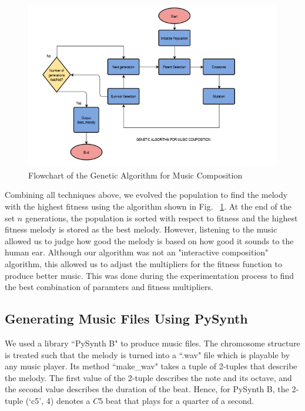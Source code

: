 \documentclass[conference]{IEEEtran}
\begin{document}
\begin{figure}
\includegraphics[width=10 cm, height= 10 cm ]{Flowchart.png}
\caption{ Flowchart of the Genetic Algorithm for Music Composition}
\label{flow}
\end{figure}

Combining all techniques above, we evolved the population to find the melody with the highest fitness using the algorithm shown in Fig. ~\ref{flow}. At the end of the set $n$ generations, the population is sorted with respect to fitness and the highest fitness melody is stored as the best melody. However, listening to the music allowed us to judge how good the melody is based on how good it sounds to the human ear. Although our algorithm was not an "interactive composition" algorithm, this allowed us to adjust the multipliers for the fitness function to produce better music. This was done during the experimentation process to find the best combination of paramters and fitness multipliers.

\subsection{Generating Music Files Using PySynth}
We used a library ``PySynth B" to produce music files. The chromosome structure is treated such that the melody is turned into a ``.wav" file which is playable by any music player. Its method ``make\_wav" takes a tuple of 2-tuples that describe the melody. The first value of the 2-tuple describes the note and its octave, and the second value describes the duration of the beat. Hence, for PySynth B, the 2-tuple (`c5', 4) denotes a $C5$ beat that plays for a quarter of a second.
\end{document}

